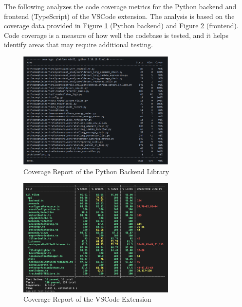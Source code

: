 \documentclass[12pt, titlepage]{article}
\begin{document}
The following analyzes the code coverage metrics for the Python
backend and frontend (TypeScript) of the VSCode extension. The
analysis is based on the coverage data provided in Figure
\ref{img:python-cov} (Python backend) and Figure \ref{img:vscode-cov}
(frontend). Code coverage is a measure of how well the codebase is
tested, and it helps identify areas that may require additional testing.

\begin{figure}[H]
  \centering
  \includegraphics[width=0.7\textwidth]{../Images/python-coverage.png}
  \caption{Coverage Report of the Python Backend Library}
  \label{img:python-cov}
\end{figure}

\begin{figure}[H]
  \centering
  \includegraphics[width=0.7\textwidth]{../Images/vscode-coverage.png}
  \caption{Coverage Report of the VSCode Extension}
  \label{img:vscode-cov}
\end{figure}
\end{document}
